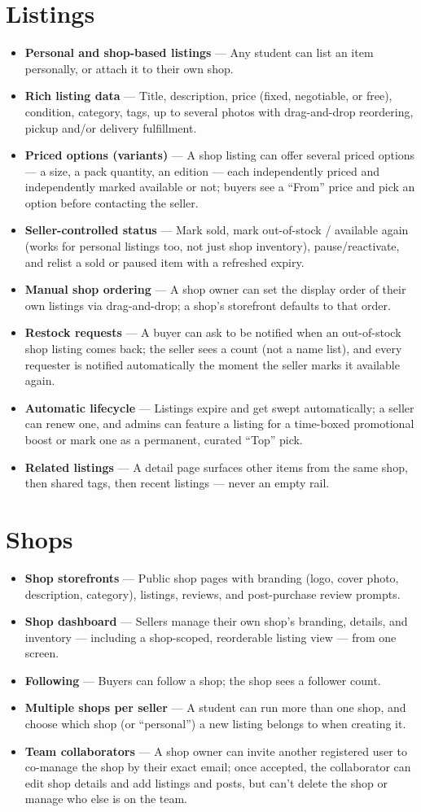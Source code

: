 \documentclass[11pt]{article}
\newcommand{\feature}[2]{%
  \item \textbf{#1} --- #2
}
\begin{document}
\section{Listings}
\begin{itemize}
  \feature{Personal and shop-based listings}{Any student can list an item personally, or attach it to their own shop.}
  \feature{Rich listing data}{Title, description, price (fixed, negotiable, or free), condition, category, tags, up to several photos with drag-and-drop reordering, pickup and/or delivery fulfillment.}
  \feature{Priced options (variants)}{A shop listing can offer several priced options --- a size, a pack quantity, an edition --- each independently priced and independently marked available or not; buyers see a ``From'' price and pick an option before contacting the seller.}
  \feature{Seller-controlled status}{Mark sold, mark out-of-stock / available again (works for personal listings too, not just shop inventory), pause/reactivate, and relist a sold or paused item with a refreshed expiry.}
  \feature{Manual shop ordering}{A shop owner can set the display order of their own listings via drag-and-drop; a shop's storefront defaults to that order.}
  \feature{Restock requests}{A buyer can ask to be notified when an out-of-stock shop listing comes back; the seller sees a count (not a name list), and every requester is notified automatically the moment the seller marks it available again.}
  \feature{Automatic lifecycle}{Listings expire and get swept automatically; a seller can renew one, and admins can feature a listing for a time-boxed promotional boost or mark one as a permanent, curated ``Top'' pick.}
  \feature{Related listings}{A detail page surfaces other items from the same shop, then shared tags, then recent listings --- never an empty rail.}
\end{itemize}

\section{Shops}
\begin{itemize}
  \feature{Shop storefronts}{Public shop pages with branding (logo, cover photo, description, category), listings, reviews, and post-purchase review prompts.}
  \feature{Shop dashboard}{Sellers manage their own shop's branding, details, and inventory --- including a shop-scoped, reorderable listing view --- from one screen.}
  \feature{Following}{Buyers can follow a shop; the shop sees a follower count.}
  \feature{Multiple shops per seller}{A student can run more than one shop, and choose which shop (or ``personal'') a new listing belongs to when creating it.}
  \feature{Team collaborators}{A shop owner can invite another registered user to co-manage the shop by their exact email; once accepted, the collaborator can edit shop details and add listings and posts, but can't delete the shop or manage who else is on the team.}
\end{itemize}
\end{document}
